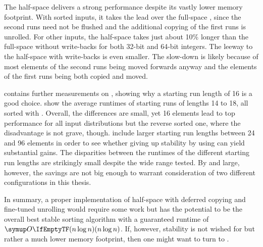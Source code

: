 The half-space \MS{} delivers a strong performance despite its vastly lower memory footprint.
With sorted inputs, it takes the lead over the full-space \MS*{}, since the second runs need not be flushed and the additional copying of the first runs is unrolled.
For other inputs, the half-space \MS{} takes just about 10\% longer than the full-space \MS{} without write-backs for both 32-bit and 64-bit integers.
The leeway to the half-space \MS{} with write-backs is even smaller.
The slow-down is likely because of most elements of the second runs being moved forwards anyway and the elements of the first runs being both copied and moved.

 contains further measurements on \MS{}, showing why a starting run length of 16 is a good choice.
 show the average runtimes of starting runs of lengths 14 to 18, all sorted with \IS{}.
Overall, the differences are small, yet 16 elements lead to top performance for all input distributions but the reverse sorted one, where the disadvantage is not grave, though.
 include larger starting run lengths between 24 and 96 elements in order to see whether giving up stability by using \ShS{} can yield substantial gains.
The disparities between the runtimes of the different starting run lengths are strikingly small despite the wide range tested.
By and large, however, the savings are not big enough to warrant consideration of two different \MS{} configurations in this thesis.

In summary, a proper implementation of half-space \MS{} with deferred copying and fine-tuned unrolling would require some work but has the potential to be the overall best stable sorting algorithm with a guaranteed runtime of \(\bigoh{n \log n}\).
If, however, stability is not wished for but rather a much lower memory footprint, then one might want to turn to \HS{}.
